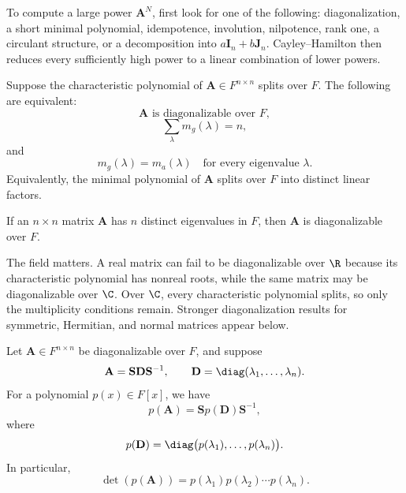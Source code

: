     \begin{strategy}
        To compute a large power $\mathbf{A}^N$, first look for one of the
        following: diagonalization, a short minimal polynomial, idempotence,
        involution, nilpotence, rank one, a circulant structure, or a decomposition
        into $a\mathbf{I}_n+b\mathbf{J}_n$. Cayley--Hamilton then reduces every
        sufficiently high power to a linear combination of lower powers.
    \end{strategy}



    \begin{theorem}
        Suppose the characteristic polynomial of
        $\mathbf{A}\in F^{n\times n}$ splits over $F$. The following are
        equivalent:
        \[
            \mathbf{A}\text{ is diagonalizable over }F,
        \]
        \[
            \sum_{\lambda}m_g(\lambda)=n,
        \]
        and
        \[
            m_g(\lambda)=m_a(\lambda)
            \quad\text{for every eigenvalue }\lambda.
        \]
        Equivalently, the minimal polynomial of $\mathbf{A}$ splits over $F$
        into distinct linear factors.
    \end{theorem}

    \begin{corollary}
        If an $n\times n$ matrix $\mathbf{A}$ has $n$ distinct eigenvalues in
        $F$, then $\mathbf{A}$ is diagonalizable over $F$.
    \end{corollary}

    \begin{remark}
        The field matters. A real matrix can fail to be diagonalizable over
        $\R$ because its characteristic polynomial has nonreal roots, while the
        same matrix may be diagonalizable over $\C$. Over $\C$, every
        characteristic polynomial splits, so only the multiplicity conditions
        remain. Stronger diagonalization results for symmetric, Hermitian, and
        normal matrices appear below.
    \end{remark}

    \begin{proposition}
        Let $\mathbf{A}\in F^{n\times n}$ be diagonalizable over $F$, and suppose
        \[
            \mathbf{A}
            =
            \mathbf{S}\mathbf{D}\mathbf{S}^{-1},
            \qquad
            \mathbf{D}
            =
            \diag(\lambda_1,\dots,\lambda_n).
        \]
        For a polynomial $p(x)\in F[x]$, we have
        \[
            p(\mathbf{A})
            =
            \mathbf{S}p(\mathbf{D})\mathbf{S}^{-1},
        \]
        where
        \[
            p(\mathbf{D})
            =
            \diag\bigl(p(\lambda_1),\dots,p(\lambda_n)\bigr).
        \]
        In particular,
        \[
            \det(p(\mathbf{A}))
            =
            p(\lambda_1)p(\lambda_2)\cdots p(\lambda_n).
        \]
    \end{proposition}

